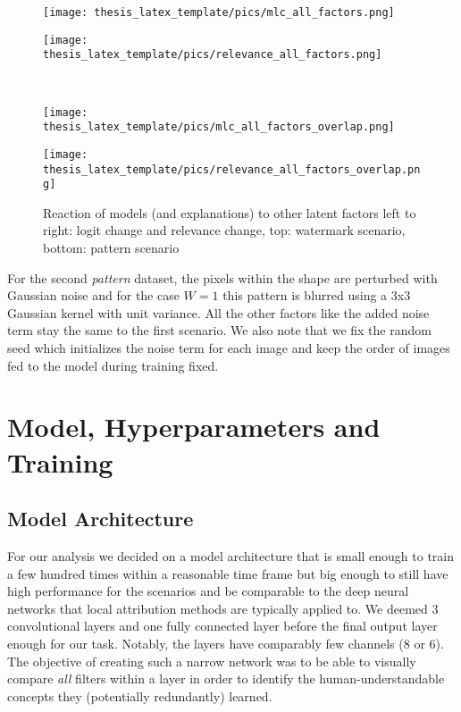 \begin{figure}[ht!]
\advance\leftskip-0.2cm
\begin{minipage}[t]{0.42\textwidth}
    \texttt{[image: thesis\_latex\_template/pics/mlc\_all\_factors.png]}
\end{minipage}
\begin{minipage}[t]{0.49\textwidth}
    \texttt{[image: thesis\_latex\_template/pics/relevance\_all\_factors.png]}
\end{minipage}\\

\begin{minipage}[t]{0.42\textwidth}
    \texttt{[image: thesis\_latex\_template/pics/mlc\_all\_factors\_overlap.png]}
\end{minipage}
\begin{minipage}[t]{0.49\textwidth}
    \texttt{[image: thesis\_latex\_template/pics/relevance\_all\_factors\_overlap.png]}
\end{minipage}
\caption{Reaction of models (and explanations) to other latent factors
left to right: logit change and relevance change, top: watermark scenario, bottom: pattern scenario }
\label{fig:other_latents_reaction}
\end{figure}

For the second \textit{pattern} dataset, the pixels within the shape are perturbed with Gaussian noise and for the case $W=1$ this pattern is blurred using a 3x3 Gaussian kernel with unit variance. All the other factors like the added noise term stay the same to the first scenario. We also note that we fix the random seed which initializes the noise term for each image and keep the order of images fed to the model during training fixed. 


\section{Model, Hyperparameters and Training}\label{appendix:model}
\subsection{Model Architecture}
For our analysis we decided on a model architecture that is small enough to train a few hundred times within a reasonable time frame but big enough to still have high performance for the scenarios and be comparable to the deep neural networks that local attribution methods are typically applied to.
We deemed 3 convolutional layers and one fully connected layer before the final output layer enough for our task. Notably, the layers have comparably few channels (8 or 6). The objective of creating such a narrow network was to be able to visually compare \textit{all} filters within a layer in order to identify the human-understandable concepts they (potentially redundantly) learned. 


